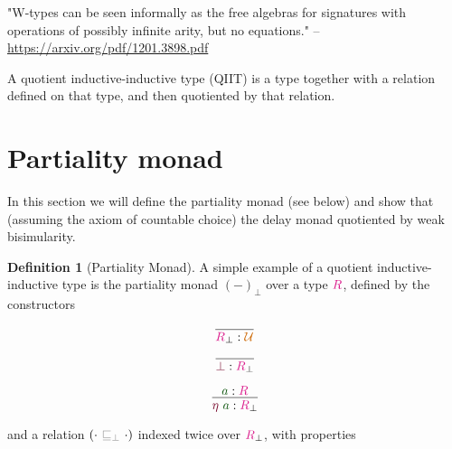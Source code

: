 \documentclass[twoside,11pt,openright]{report}
\theoremstyle{plain} %
\theoremstyle{definition}
\newtheorem{defn}{Definition}[section]
\theoremstyle{remark}
\newcommand*{\term}[1]{\textcolor{green!30!black}{#1}} %
\newcommand*{\type}[1]{\textcolor{magenta!90!black}{#1}}
\newcommand*{\universe}[1]{\textcolor{orange!80!black}{#1}}
\newcommand*{\relation}[1]{\textcolor{gray}{\ensuremath{\mathtt{#1}}}}
\newcommand*{\constructor}[1]{\textcolor{purple!60!black}{\ensuremath{\mathtt{#1}}}}
\begin{document}
"W-types can be seen informally as the free algebras for signatures with operations of possibly infinite arity, but no equations." -- \url{https://arxiv.org/pdf/1201.3898.pdf}

A quotient inductive-inductive type (QIIT) is a type together with a relation defined on that type, and then quotiented by that relation.

\section{Partiality monad}
In this section we will define the partiality monad (see below) and show that (assuming the axiom of countable choice) the delay monad quotiented by weak bisimularity.
\begin{defn}[Partiality Monad]
  A simple example of a quotient inductive-inductive type is the partiality monad \((-)_\bot\) over a type \(\type{R}\), defined by the constructors\\[-9mm]
  \begin{center}
    \begin{minipage}{0.25\linewidth}
      \begin{equation}
        \infer{\type{R}_\bot : \universe{\mathcal{U}}}{}
      \end{equation}
    \end{minipage}
    \hfill
    \begin{minipage}{0.25\linewidth}
      \begin{equation}
        \infer{\constructor{\bot} : \type{R}_\bot}{}
      \end{equation}
    \end{minipage}
    \hfill
    \begin{minipage}{0.25\linewidth}
      \begin{equation}
        \infer{\constructor{\eta}~\term{a} : \type{R}_\bot}{\term{a} : \type{R}}
      \end{equation}
    \end{minipage}
  \end{center}
  and a relation \((\cdot~\relation{\sqsubseteq_{\bot}}~\cdot)\) indexed twice over \(\type{R}_\bot\), with properties\\[-9mm] 
  \begin{center}
    \begin{minipage}{0.45\linewidth}

\end{minipage}
\end{center}
\end{defn}
\end{document}
